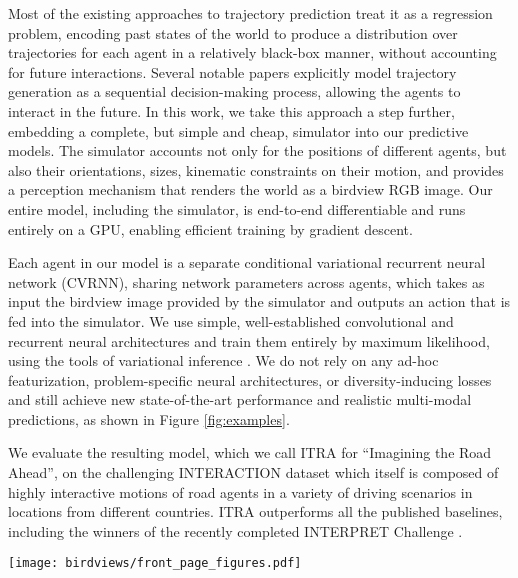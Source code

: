 \documentclass[letterpaper, 10 pt, conference]{ieeeconf}
\begin{document}
Most of the existing approaches to trajectory prediction \cite{lee_desire_2017, sadeghian_sophie_2018, gupta_social_2018, zhao_multi-agent_2019, zhao_tnt_2020} treat it as a regression problem, encoding past states of the world to produce a distribution over trajectories for each agent in a relatively black-box manner, without accounting for future interactions. Several notable papers \cite{rhinehart_precog_2019, tang_multiple_2019, casas_implicit_2020, alahi_social_2016} explicitly model trajectory generation as a sequential decision-making process, allowing the agents to interact in the future. In this work, we take this approach a step further, embedding a complete, but simple and cheap, simulator into our predictive models. The simulator accounts not only for the positions of different agents, but also their orientations, sizes, kinematic constraints on their motion, and provides a perception mechanism that renders the world as a birdview RGB image. Our entire model, including the simulator, is end-to-end differentiable and runs entirely on a GPU, enabling efficient training by gradient descent.

Each agent in our model is a separate conditional variational recurrent neural network (CVRNN), sharing network parameters across agents, which takes as input the birdview image provided by the simulator and outputs an action that is fed into the simulator. We use simple, well-established convolutional and recurrent neural architectures and train them entirely by maximum likelihood, using the tools of variational inference \cite{wainwright_graphical_2008, blei_variational_2017}. We do not rely on any ad-hoc featurization, problem-specific neural architectures, or diversity-inducing losses and still achieve new state-of-the-art performance and realistic multi-modal predictions, as shown in Figure \ref{fig:examples}.

We evaluate the resulting model, which we call ITRA for ``Imagining the Road Ahead'', on the challenging INTERACTION dataset \cite{zhan_interaction_2019} which itself is composed of highly interactive motions of road agents in a variety of driving scenarios in locations from different countries. ITRA outperforms all the published baselines, including the winners of the recently completed INTERPRET Challenge \cite{mo_recog_2020}.

\begin{figure*}[t]
    \centering
    \texttt{[image: birdviews/front\_page\_figures.pdf]}
    \label{fig:examples}
\end{figure*}
\end{document}
